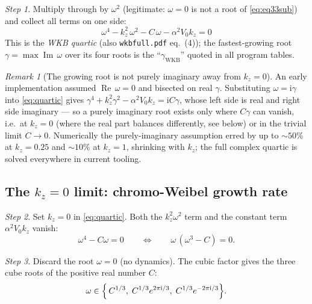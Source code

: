 \documentclass[11pt,a4paper]{article}
\numberwithin{equation}{section}
\theoremstyle{remark}
\newtheorem{remark}[lemma]{Remark}
\newtheorem{step}{Step}[subsection]
\newcommand{\Vo}{V_0}
\newcommand{\kz}{k_z}
\newcommand{\ii}{\mathrm{i}}
\newcommand{\Rey}{\operatorname{Re}}
\newcommand{\Imy}{\operatorname{Im}}
\begin{document}
\begin{step}
Multiply through by $\omega^2$ (legitimate: $\omega=0$ is not a root of
\eqref{eq:eq33sub}) and collect all terms on one side:
\begin{equation}
\boxed{\;
\omega^4-\kz^2\,\omega^2-C\,\omega-\alpha^2\Vo\kz=0
\;}
\label{eq:quartic}
\end{equation}
This is the \emph{WKB quartic} (also \texttt{wkbfull.pdf} eq.~(4)); the
fastest-growing root $\gamma=\max\Imy\,\omega$ over its four roots is the
``$\gamma_{\mathrm{WKB}}$'' quoted in all program tables.
\end{step}

\begin{remark}[The growing root is not purely imaginary away from $\kz=0$]
\label{rem:notpureim}
An early implementation assumed $\Rey\,\omega=0$ and bisected on real
$\gamma$. Substituting $\omega=\ii\gamma$ into \eqref{eq:quartic} gives
$\gamma^4+\kz^2\gamma^2-\alpha^2\Vo\kz=\ii C\gamma$, whose left side is real
and right side imaginary --- so a purely imaginary root exists only where
$C\gamma$ can vanish, i.e.\ at $\kz=0$ (where the real part balances
differently, see below) or in the trivial limit $C\to0$. Numerically the
purely-imaginary assumption erred by up to $\sim50\%$ at $\kz=0.25$ and
$\sim10\%$ at $\kz=1$, shrinking with $\kz$; the full complex quartic is
solved everywhere in current tooling.
\end{remark}

\subsection{The $\kz=0$ limit: chromo-Weibel growth rate}
\label{ssec:weibel}

\begin{step}
Set $\kz=0$ in \eqref{eq:quartic}. Both the $\kz^2\omega^2$ term and the
constant term $\alpha^2\Vo\kz$ vanish:
\begin{equation}
\omega^4-C\omega=0
\qquad\Longleftrightarrow\qquad
\omega\,(\omega^3-C)=0 .
\end{equation}
\end{step}

\begin{step}
Discard the root $\omega=0$ (no dynamics). The cubic factor gives the three
cube roots of the positive real number $C$:
\begin{equation}
\omega\in\Bigl\{\,C^{1/3},\;
C^{1/3}e^{2\pi\ii/3},\;
C^{1/3}e^{-2\pi\ii/3}\Bigr\}.
\end{equation}
\end{step}
\end{document}
